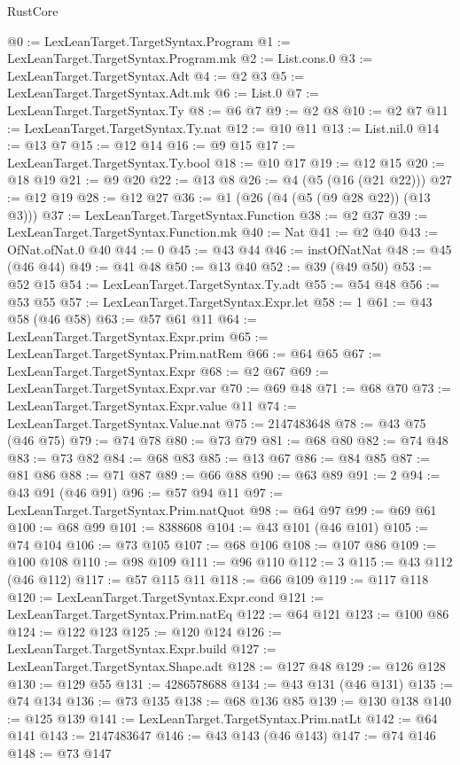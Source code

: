 \begin{lexlean}{RustCore}
\begin{coremodule}
@0 := LexLeanTarget.TargetSyntax.Program
@1 := LexLeanTarget.TargetSyntax.Program.mk
@2 := List.cons.{0}
@3 := LexLeanTarget.TargetSyntax.Adt
@4 := @2 @3
@5 := LexLeanTarget.TargetSyntax.Adt.mk
@6 := List.{0}
@7 := LexLeanTarget.TargetSyntax.Ty
@8 := @6 @7
@9 := @2 @8
@10 := @2 @7
@11 := LexLeanTarget.TargetSyntax.Ty.nat
@12 := @10 @11
@13 := List.nil.{0}
@14 := @13 @7
@15 := @12 @14
@16 := @9 @15
@17 := LexLeanTarget.TargetSyntax.Ty.bool
@18 := @10 @17
@19 := @12 @15
@20 := @18 @19
@21 := @9 @20
@22 := @13 @8
@26 := @4 (@5 (@16 (@21 @22)))
@27 := @12 @19
@28 := @12 @27
@36 := @1 (@26 (@4 (@5 (@9 @28 @22)) (@13 @3)))
@37 := LexLeanTarget.TargetSyntax.Function
@38 := @2 @37
@39 := LexLeanTarget.TargetSyntax.Function.mk
@40 := Nat
@41 := @2 @40
@43 := OfNat.ofNat.{0} @40
@44 := 0
@45 := @43 @44
@46 := instOfNatNat
@48 := @45 (@46 @44)
@49 := @41 @48
@50 := @13 @40
@52 := @39 (@49 @50)
@53 := @52 @15
@54 := LexLeanTarget.TargetSyntax.Ty.adt
@55 := @54 @48
@56 := @53 @55
@57 := LexLeanTarget.TargetSyntax.Expr.let
@58 := 1
@61 := @43 @58 (@46 @58)
@63 := @57 @61 @11
@64 := LexLeanTarget.TargetSyntax.Expr.prim
@65 := LexLeanTarget.TargetSyntax.Prim.natRem
@66 := @64 @65
@67 := LexLeanTarget.TargetSyntax.Expr
@68 := @2 @67
@69 := LexLeanTarget.TargetSyntax.Expr.var
@70 := @69 @48
@71 := @68 @70
@73 := LexLeanTarget.TargetSyntax.Expr.value @11
@74 := LexLeanTarget.TargetSyntax.Value.nat
@75 := 2147483648
@78 := @43 @75 (@46 @75)
@79 := @74 @78
@80 := @73 @79
@81 := @68 @80
@82 := @74 @48
@83 := @73 @82
@84 := @68 @83
@85 := @13 @67
@86 := @84 @85
@87 := @81 @86
@88 := @71 @87
@89 := @66 @88
@90 := @63 @89
@91 := 2
@94 := @43 @91 (@46 @91)
@96 := @57 @94 @11
@97 := LexLeanTarget.TargetSyntax.Prim.natQuot
@98 := @64 @97
@99 := @69 @61
@100 := @68 @99
@101 := 8388608
@104 := @43 @101 (@46 @101)
@105 := @74 @104
@106 := @73 @105
@107 := @68 @106
@108 := @107 @86
@109 := @100 @108
@110 := @98 @109
@111 := @96 @110
@112 := 3
@115 := @43 @112 (@46 @112)
@117 := @57 @115 @11
@118 := @66 @109
@119 := @117 @118
@120 := LexLeanTarget.TargetSyntax.Expr.cond
@121 := LexLeanTarget.TargetSyntax.Prim.natEq
@122 := @64 @121
@123 := @100 @86
@124 := @122 @123
@125 := @120 @124
@126 := LexLeanTarget.TargetSyntax.Expr.build
@127 := LexLeanTarget.TargetSyntax.Shape.adt
@128 := @127 @48
@129 := @126 @128
@130 := @129 @55
@131 := 4286578688
@134 := @43 @131 (@46 @131)
@135 := @74 @134
@136 := @73 @135
@138 := @68 @136 @85
@139 := @130 @138
@140 := @125 @139
@141 := LexLeanTarget.TargetSyntax.Prim.natLt
@142 := @64 @141
@143 := 2147483647
@146 := @43 @143 (@46 @143)
@147 := @74 @146
@148 := @73 @147

\end{coremodule}
\end{lexlean}
